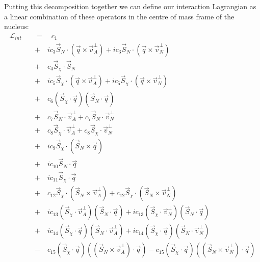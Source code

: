 \par
Putting this decomposition together we can define our interaction Lagrangian as a linear combination of these operators in the centre of mass frame of the nucleus:
\begin{equation}
\begin{split}
    \mathcal{L}_{int}\quad  & =\quad c_1 \\
             & +\quad ic_3 \vec{S}_{N} \cdot ( \vec{q} \times \vec{v}^{\perp}_{A} ) + ic_3 \vec{S}_{N}
             \cdot( \vec{q} \times \vec{v}^{\perp}_{N} ) \\
             & +\quad c_4 \vec{S}_{\chi} \cdot \vec{S}_{N} \\
             & +\quad ic_5 \vec{S}_{\chi} \cdot(\vec{q} \times \vec{v}^{\perp}_{A}) + ic_5 \vec{S}_{\chi} \cdot ( \vec{q} \times \vec{v}^{\perp}_{N} ) \\
             & +\quad c_6 ( \vec{S}_{\chi} \cdot \vec{q} ) (\vec{S}_{N} \cdot \vec{q} ) \\
             & +\quad c_7 \vec{S}_{N} \cdot \vec{v}^{\perp}_{A} + c_7 \vec{S}_{N} \cdot \vec{v}^{\perp}_{N} \\
             & +\quad c_8 \vec{S}_{\chi} \cdot \vec{v}^{\perp}_{A} + c_8 \vec{S}_{\chi} \cdot \vec{v}^{\perp}_{N} \\
             & +\quad ic_9 \vec{S}_{\chi} \cdot ( \vec{S}_{N} \times \vec{q} ) \\
             & +\quad ic_{10} \vec{S}_{N} \cdot \vec{q} \\
             & +\quad ic_{11} \vec{S}_{\chi} \cdot \vec{q} \\
             & +\quad c_{12} \vec{S}_{\chi} \cdot ( \vec{S}_{N} \times \vec{v}^{\perp}_{A} ) + c_{12} \vec{S}_{\chi} \cdot ( \vec{S}_{N} \times \vec{v}^{\perp}_{N} ) \\
             & +\quad ic_{13} ( \vec{S}_{\chi} \cdot \vec{v}^{\perp}_{A} ) ( \vec{S}_{N} \cdot \vec{q} ) + ic_{13} ( \vec{S}_{\chi} \cdot \vec{v}^{\perp}_{N} ) ( \vec{S}_{N} \cdot \vec{q} ) \\
             & +\quad ic_{14} ( \vec{S}_{\chi} \cdot \vec{q} ) ( \vec{S}_{N} \cdot \vec{v}^{\perp}_{A} ) + ic_{14} ( \vec{S}_{\chi} \cdot \vec{q} ) ( \vec{S}_{N} \cdot \vec{v}^{\perp}_{N} ) \\
             & -\quad c_{15}(\vec{S}_{\chi} \cdot \vec{q}) ( ( \vec{S}_{N} \times \vec{v}^{\perp}_{A} ) \cdot \vec{q} ) - c_{15} ( \vec{S}_{\chi} \cdot \vec{q} ) ( ( \vec{S}_{N} \times \vec{v}^{\perp}_{N} ) \cdot \vec{q} )
\end{split}
\label{eq:eft_operator_lagrangian_com}
\end{equation}

